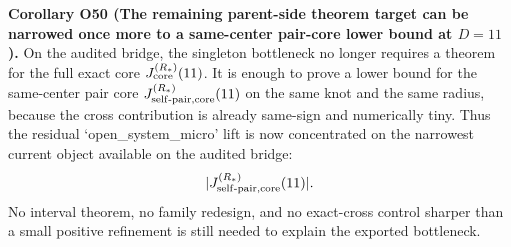 \documentclass[aps,prd,onecolumn,notitlepage,nofootinbib,superscriptaddress,11pt,floatfix]{revtex4-2}
\begin{document}
\medskip\noindent\textbf{Corollary O50 (The remaining parent-side theorem target can be narrowed once more to a same-center pair-core lower bound at \(D=11\)).}
On the audited bridge, the singleton bottleneck no longer requires a theorem for the full exact core \(J_{\rm core}^{(R_\ast)}(11)\).  It is enough to prove a lower bound for the same-center pair core \(J_{{\rm self\text{-}pair},{\rm core}}^{(R_\ast)}(11)\) on the same knot and the same radius, because the cross contribution is already same-sign and numerically tiny.  Thus the residual `open\_system\_micro' lift is now concentrated on the narrowest current object available on the audited bridge:
\[
|J_{{\rm self\text{-}pair},{\rm core}}^{(R_\ast)}(11)|.
\]
No interval theorem, no family redesign, and no exact-cross control sharper than a small positive refinement is still needed to explain the exported bottleneck.
\end{document}
